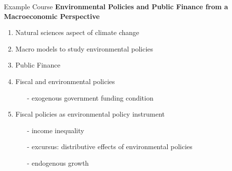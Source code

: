 \begin{frame}{Example Course}
\alert{\textbf{Environmental Policies and Public Finance from a Macroeconomic Perspective}}
	\pause
\begin{enumerate}[<+->]
	\item Natural sciences aspect of climate change \footnotesize{\citep{Hassler2016EnvironmentalMacroeconomics, Hsiang2018AnScience}} \normalsize
	\item Macro models to study environmental policies \footnotesize{\citep{Acemoglu2012TheChange, Golosov2014OptimalEquilibrium, Acemoglu2016TransitionTechnology, Fried2018ClimateAnalysis}} \normalsize
	\item Public Finance \footnotesize{\citep{ Domeij2004OnTaxes, Conesa2009TaxingAll, Heathcote2017OptimalFramework}} \normalsize
	\item Fiscal and environmental policies
	\begin{itemize}
		\item[-] exogenous government funding condition \footnotesize{\citep{LansBovenberg1994EnvironmentalTaxation, Goulder1995EnvironmentalGuide, Barrage2019OptimalPolicy}}
	\end{itemize}
\item Fiscal policies as environmental policy instrument
\begin{itemize}
		\item[-] income inequality \footnotesize{\citep{Jacobs2019RedistributionCurves, Dobkowitz2022, Douenne2022OptimalHouseholds}} \normalsize
		\item[-] excursus: distributive effects of environmental policies \footnotesize{\citep{Fried2018TheGenerations, Goulder2019IncomeGroups, Kotlikoff2021MakingWin}} \normalsize
		\item[-] endogenous growth \footnotesize{\citep{Dobkowitz2022}}
\end{itemize}
\end{enumerate}
\end{frame}

